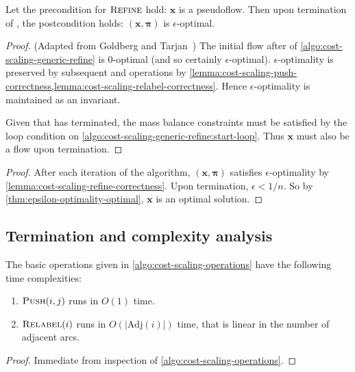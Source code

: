 \begin{lemma}
    \label{lemma:cost-scaling-refine-correctness}
    Let the precondition for $\textproc{Refine}$ hold: $\mathbf{x}$ is a pseudoflow. Then upon termination of , the postcondition holds: $\left(\mathbf{x},\boldsymbol{\pi}\right)$ is $\epsilon$-optimal.
\end{lemma}
\begin{proof} (Adapted from Goldberg and Tarjan~\cite[theorem~5.4]{Goldberg:1987})
    The initial flow after  of \cref{algo:cost-scaling-generic-refine} is $0$-optimal (and so certainly $\epsilon$-optimal). $\epsilon$-optimality is preserved by subsequent  and  operations by \cref{lemma:cost-scaling-push-correctness,lemma:cost-scaling-relabel-correctness}. Hence $\epsilon$-optimality is maintained as an invariant.
    
    Given that  has terminated, the mass balance constraints must be satisfied by the loop condition on \cref{algo:cost-scaling-generic-refine:start-loop}. Thus $\mathbf{x}$ must also be a flow upon termination.
\end{proof}

\costscalingcorrectness*
\begin{proof}
    After each iteration of the algorithm, $\left(\mathbf{x},\boldsymbol{\pi}\right)$ satisfies $\epsilon$-optimality by \cref{lemma:cost-scaling-refine-correctness}. Upon termination, $\epsilon < 1/n$. So by \cref{thm:epsilon-optimality-optimal}, $\mathbf{x}$ is an optimal solution.
\end{proof}

\subsection{Termination and complexity analysis} \label{appendix:impl-cs:analysis}

\begin{lemma} \label{lemma:cost-scaling-operations-complexity}
    The basic operations given in \cref{algo:cost-scaling-operations} have the following time complexities:
    \begin{enumerate}[label=(\alph*)]
        \item $\textproc{Push}(i,j)$ runs in $O(1)$ time.
        \item $\textproc{Relabel}(i)$ runs in $O\left(\left|\mathrm{Adj}(i)\right|\right)$ time, that is linear in the number of adjacent arcs.
    \end{enumerate}
\end{lemma}
\begin{proof}
    Immediate from inspection of \cref{algo:cost-scaling-operations}.
\end{proof}

